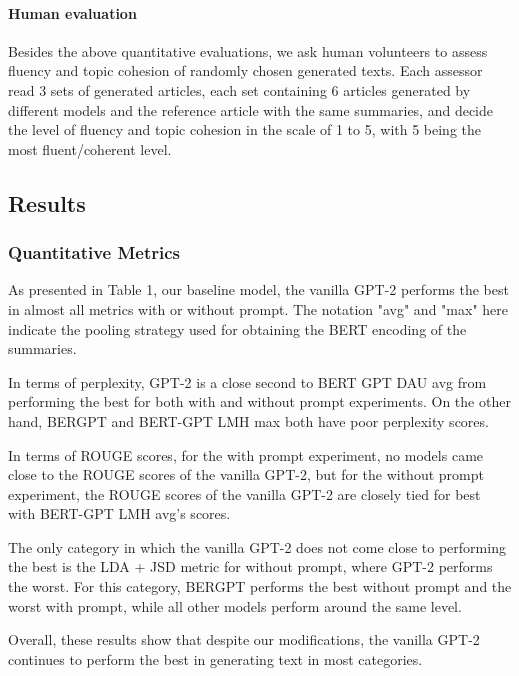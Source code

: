 \documentclass{article}
\begin{document}
\paragraph{Human evaluation}
Besides the above quantitative evaluations, we ask human volunteers to assess fluency and topic cohesion of randomly chosen generated texts. Each assessor read 3 sets of generated articles, each set containing 6 articles generated by different models and the reference article with the same summaries, and decide the level of fluency and topic cohesion in the scale of 1 to 5, with 5 being the most fluent/coherent level.


\subsection{Results}

\subsubsection{Quantitative Metrics}
As presented in Table 1, our baseline model, the vanilla GPT-2 performs the best in almost all metrics with or without prompt. The notation "avg" and "max" here indicate the pooling strategy used for obtaining the BERT encoding of the summaries.  

In terms of perplexity, GPT-2 is a close second to BERT GPT DAU avg from performing the best for both with and without prompt experiments. On the other hand, BERGPT and BERT-GPT LMH max both have poor perplexity scores.

In terms of ROUGE scores, for the with prompt experiment, no models came close to the ROUGE scores of the vanilla GPT-2, but for the without prompt experiment, the ROUGE scores of the vanilla GPT-2 are closely tied for best with BERT-GPT LMH avg's scores.

The only category in which the vanilla GPT-2 does not come close to performing the best is the LDA + JSD metric for without prompt, where GPT-2 performs the worst. For this category, BERGPT performs the best without prompt and the worst with prompt, while all other models perform around the same level.

Overall, these results show that despite our modifications, the vanilla GPT-2 continues to perform the best in generating text in most categories.
\end{document}
